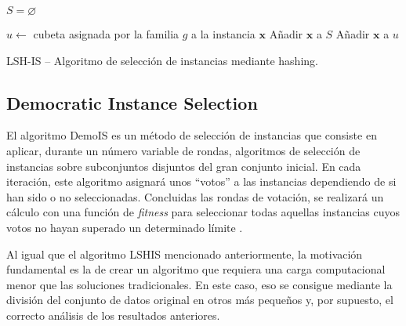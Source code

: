 \begin{algorithm*}
\DontPrintSemicolon
{}

$ S = \varnothing $

 {
   {
     $u\leftarrow$ cubeta asignada por la familia $g$ a la instancia $\mathbf{x}$ \;
     {
       Añadir $ \mathbf{x} $ a $ S $ \;
       Añadir $ \mathbf{x} $ a $ u $ \;
     }
  }
}

\caption{LSH-IS -- Algoritmo de selección de instancias mediante hashing. \cite{LSHISPaper}}
\label{alg:LSHIS}
\end{algorithm*}

\subsection{Democratic Instance Selection}\label{sec:defDemoIS}

El algoritmo DemoIS es un método de selección de instancias que consiste en aplicar, durante un número variable de rondas, algoritmos de selección de instancias sobre subconjuntos disjuntos del gran conjunto inicial. En cada iteración, este algoritmo asignará unos ``votos'' a las instancias dependiendo de si han sido o no seleccionadas. Concluidas las rondas de votación, se realizará un cálculo con una función de \textit{fitness} para seleccionar todas aquellas instancias cuyos votos no hayan superado un determinado límite \cite{DemoISPaper}.
 
Al igual que el algoritmo LSHIS mencionado anteriormente, la motivación fundamental es la de crear un algoritmo que requiera una carga computacional menor que las soluciones tradicionales. En este caso, eso se consigue mediante la división del conjunto de datos original en otros más pequeños y, por supuesto, el correcto análisis de los resultados anteriores.


